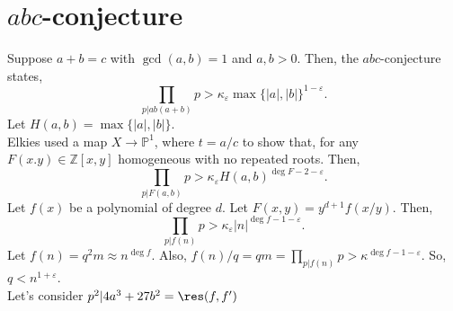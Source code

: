 \section{$abc$-conjecture}

Suppose $a+b=c$ with $\gcd(a,b)=1$ and $a,b > 0$.  Then, the $abc$-conjecture states,
\begin{equation*}
\prod_{p|ab(a+b)} p > \kappa_{\varepsilon} \max\{|a|,|b|\}^{1-\varepsilon}.
\end{equation*}
Let $H(a,b)=\max\{|a|,|b|\}$.\\
\indent Elkies used a map $X \to \mathbb{P}^{1}$, where $t=a/c$ to show that, for any $F(x.y) \in \mathbb{Z}[x,y]$ homogeneous with no repeated roots.  Then,
\begin{equation*}
\prod_{p|F(a,b)} p > \kappa_{\varepsilon} H(a,b)^{\deg F-2-\varepsilon}.
\end{equation*}
Let $f(x)$ be a polynomial of degree $d$.  Let $F(x,y)=y^{d+1}f(x/y)$.  Then,
\begin{equation*}
\prod_{p|f(n)} p > \kappa_{\varepsilon} |n|^{\deg f-1-\varepsilon}.
\end{equation*}
Let $f(n)=q^{2}m \approx n^{\deg f}$.  Also, $f(n)/q=qm=\prod_{p|f(n)}p > \kappa^{\deg f-1-\varepsilon}$.  So, $q < n^{1+\varepsilon}$.\\
\indent Let's consider $p^{2}|4a^{3}+27b^{2}=\res(f,f^{\prime})$
